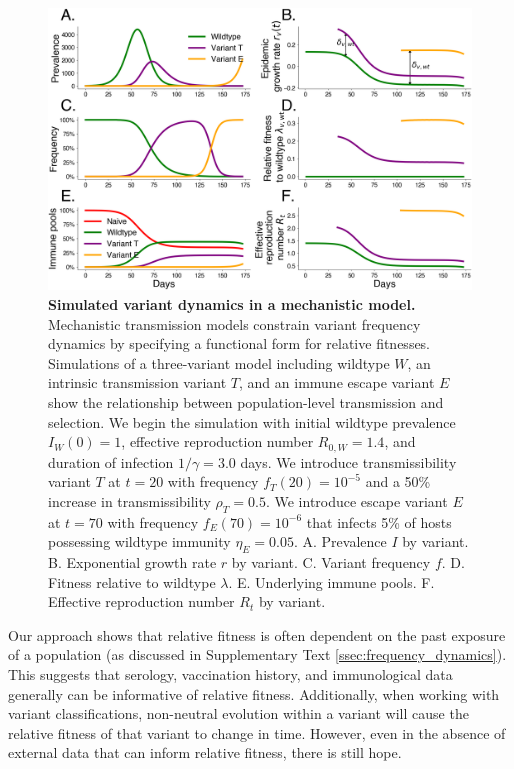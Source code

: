 \documentclass[11pt,oneside,letterpaper]{article}
\newcommand{\wt}{W}
\newcommand{\varEscape}{\eta}
\newcommand{\varTransmission}{\rho}
\begin{document}
\begin{figure}[h]
    \centering
    \includegraphics[width=1.0\linewidth]{./figures/vis_mechanisms.png}
    \caption{
      \textbf{Simulated variant dynamics in a mechanistic model.}
      Mechanistic transmission models constrain variant frequency dynamics by specifying a functional form for relative fitnesses.
      Simulations of a three-variant model including wildtype $W$, an intrinsic transmission variant $T$, and an immune escape variant $E$ show the relationship between population-level transmission and selection.
      We begin the simulation with initial wildtype prevalence $I_\wt(0) = 1$, effective reproduction number $R_{0,\wt} = 1.4$, and duration of infection $1/\gamma = 3.0$ days.
      We introduce transmissibility variant $T$ at $t=20$ with frequency $f_T(20) = 10^{-5}$ and a 50\% increase in transmissibility $\varTransmission_T = 0.5$.
      We introduce escape variant $E$ at $t=70$ with frequency $f_E(70) = 10^{-6}$ that infects 5\% of hosts possessing wildtype immunity $\varEscape_E = 0.05$.
      A. Prevalence $I$ by variant.
      B. Exponential growth rate $r$ by variant.
      C. Variant frequency $f$.
      D. Fitness relative to wildtype $\lambda$.
      E. Underlying immune pools.
      F. Effective reproduction number $R_t$ by variant.
    }
    \label{fig:vis_mechanisms}
\end{figure}


Our approach shows that relative fitness is often dependent on the past exposure of a population (as discussed in Supplementary Text \ref{ssec:frequency_dynamics}).
This suggests that serology, vaccination history, and immunological data generally can be informative of relative fitness.
Additionally, when working with variant classifications, non-neutral evolution within a variant will cause the relative fitness of that variant to change in time.
However, even in the absence of external data that can inform relative fitness, there is still hope.
\end{document}
